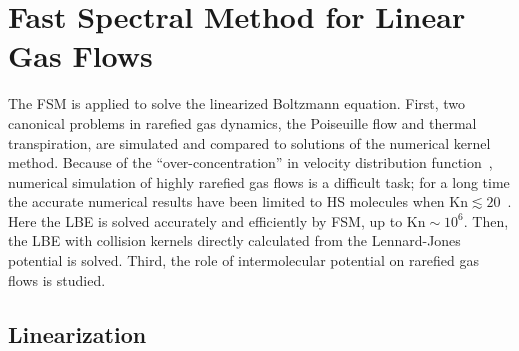 

\chapter{Fast Spectral Method for Linear Gas Flows}
\label{chap:linearized}

The FSM is applied to solve the linearized Boltzmann equation. First, two canonical problems in rarefied gas dynamics, the Poiseuille flow and thermal transpiration, are simulated and compared to solutions of the numerical kernel method. Because of the ``over-concentration'' in velocity distribution function~\cite{Takata2011}, numerical simulation of highly rarefied gas flows is a difficult task; for a long time the accurate numerical results have been limited to HS molecules when $\text{Kn}\lesssim20$~\cite{Ohwada_sone_1989,Doi2010}. Here the LBE is solved accurately and efficiently by FSM, up to $\text{Kn}\sim10^6$. 
Then, the LBE with collision kernels directly calculated from the Lennard-Jones potential is solved. Third, the role of intermolecular potential on rarefied gas flows is studied. 





\section{Linearization}\label{linearization_FSM}

